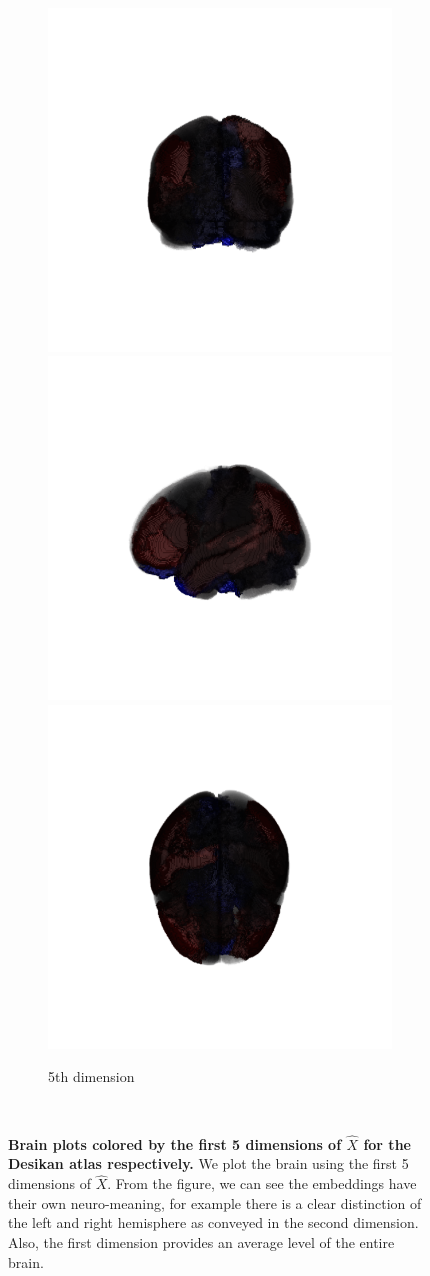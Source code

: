 \documentclass[10pt,letterpaper]{article}
\renewcommand{\hat}{\widehat}
\begin{document}
\begin{figure}
\begin{subfigure}[t]{.7\textwidth}
\begin{center}
\end{center}
\end{subfigure}\\
\vspace*{5pt}
\begin{subfigure}[t]{.7\textwidth}
\caption{5th dimension}
\vspace*{-16pt}
\begin{center}
  \includegraphics[trim={5cm 5cm  4cm  4cm },clip,height=.35\linewidth]{desikan5a.png}\hspace{-10pt}
  \includegraphics[trim={5cm 5cm  4cm  4cm },clip,height=.35\linewidth]{desikan5b.png}\hspace{-10pt}
  \includegraphics[trim={5cm 5cm  4cm  4cm },clip,height=.35\linewidth]{desikan5c.png}
\end{center}
\end{subfigure}\\
\caption{{\bf Brain plots colored by the first 5 dimensions of $\hat{X}$ for the Desikan atlas respectively.}
We plot the brain using the first 5 dimensions of $\hat{X}$. From the figure, we can see the embeddings have their own neuro-meaning, for example there is a clear distinction of the left and right hemisphere as conveyed in the second dimension. Also, the first dimension provides an average level of the entire brain.}
\label{fig:eigenvector_brain}
\end{figure}
\end{document}
